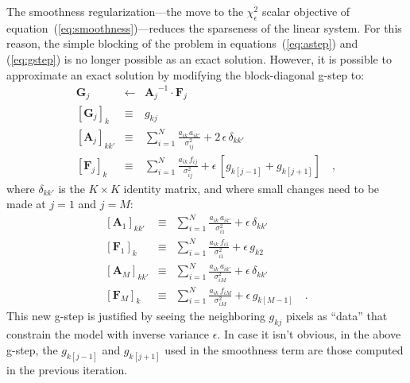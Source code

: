\documentclass[12pt,preprint]{aastex}
\newcommand{\equationname}{equation}
\newcommand{\tv}[1]{\boldsymbol{#1}}
\newcommand{\inverse}[1]{{#1}^{-1}}
\begin{document}
The smoothness regularization---the move to the $\chi^2_{\epsilon}$
scalar objective of \equationname~(\ref{eq:smoothness})---reduces the
sparseness of the linear system.  For this reason, the simple blocking
of the problem in {\equationname}s~(\ref{eq:astep}) and
(\ref{eq:gstep}) is no longer possible as an exact solution.  However,
it is possible to approximate an exact solution by modifying the
block-diagonal g-step to:
\begin{eqnarray}\label{eq:gstep_smooth}\displaystyle
\tv{G}_j & \gets & \inverse{\tv{A}_j}\cdot\tv{F}_j \nonumber\\
\left[\tv{G}_j\right]_k & \equiv & g_{kj} \nonumber\\
\left[\tv{A}_j\right]_{kk'} & \equiv & \sum_{i=1}^{N} \frac{a_{ik}\,a_{ik'}}{\sigma_{ij}^2} + 2\,\epsilon\,\delta_{kk'} \nonumber\\
\left[\tv{F}_j\right]_k     & \equiv & \sum_{i=1}^{N} \frac{a_{ik}\,f_{i j}}{\sigma_{ij}^2} + \epsilon\,[g_{k[j-1]} + g_{k[j+1]}]
\quad ,
\end{eqnarray}
where $\delta_{kk'}$ is the $K\times K$ identity matrix, and where
small changes need to be made at $j=1$ and $j=M$:
\begin{eqnarray}\label{eq:gstep_tweaks}\displaystyle
\left[\tv{A}_1\right]_{kk'} & \equiv & \sum_{i=1}^{N} \frac{a_{ik}\,a_{ik'}}{\sigma_{i1}^2} + \epsilon\,\delta_{kk'} \nonumber\\
\left[\tv{F}_1\right]_k     & \equiv & \sum_{i=1}^{N} \frac{a_{ik}\,f_{i 1}}{\sigma_{i1}^2} + \epsilon\,g_{k2} \nonumber\\
\left[\tv{A}_M\right]_{kk'} & \equiv & \sum_{i=1}^{N} \frac{a_{ik}\,a_{ik'}}{\sigma_{iM}^2} + \epsilon\,\delta_{kk'} \nonumber\\
\left[\tv{F}_M\right]_k     & \equiv & \sum_{i=1}^{N} \frac{a_{ik}\,f_{i M}}{\sigma_{iM}^2} + \epsilon\,g_{k[M-1]}
\quad .
\end{eqnarray}
This new g-step is justified by seeing the neighboring $g_{kj}$ pixels
as ``data'' that constrain the model with inverse variance $\epsilon$.
In case it isn't obvious, in the above g-step, the $g_{k[j-1]}$ and
$g_{k[j+1]}$ used in the smoothness term are those computed in the
previous iteration.
\end{document}
